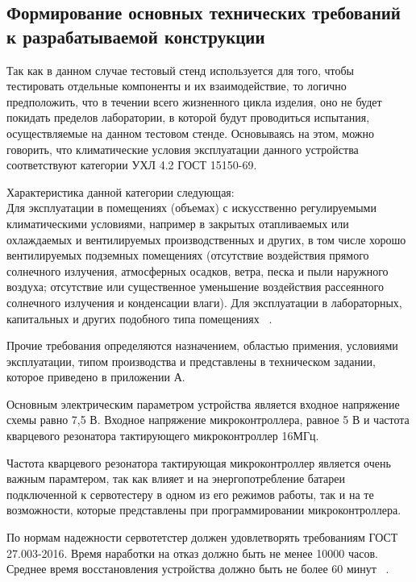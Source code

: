 \subsection{Формирование основных технических требований \\
  к разрабатываемой конструкции}

Так как в данном случае тестовый стенд используется для того, чтобы
тестировать отдельные компоненты и их взаимодействие, то логично
предположить, что в течении всего жизненного цикла изделия, оно не
будет покидать пределов лаборатории, в которой будут проводиться
испытания, осуществляемые на данном тестовом стенде.  Основываясь на
этом, можно говорить, что климатические условия эксплуатации данного
устройства соответствуют категории УХЛ 4.2 ГОСТ 15150-69.

Характеристика данной категории следующая:\\
Для эксплуатации в помещениях (объемах) с искусственно регулируемыми климатическими
условиями, например в закрытых отапливаемых или охлаждаемых и
вентилируемых производственных и других, в том числе хорошо
вентилируемых подземных помещениях (отсутствие воздействия прямого
солнечного излучения, атмосферных осадков, ветра, песка и пыли
наружного воздуха; отсутствие или существенное уменьшение воздействия
рассеянного солнечного излучения и конденсации влаги). Для эксплуатации
в лабораторных, капитальных и других подобного типа помещениях
~\cite{GOST-15150-69}.

Прочие требования определяются назначением, областью примения,
условиями эксплуатации, типом производства и представлены в техническом задании,
которое приведено в приложении А.

Основным электрическим параметром устройства является входное
напряжение схемы равно 7,5 В. Входное напряжение микроконтроллера,
равное 5 В и частота  кварцевого резонатора
тактирующего микроконтроллер 16МГц.

Частота кварцевого резонатора тактирующая микроконтроллер является
очень важным парамтером, так как влияет и на энергопотребление
батареи подключенной к сервотестеру в одном из его режимов работы,
так и на те возможности,
которые представлены при программировании микроконтроллера.

По нормам надежности сервотетстер должен
удовлетворять требованиям ГОСТ 27.003-2016. Время наработки на отказ
должно быть не менее 10000 часов. Среднее время восстановления
устройства должно быть не более 60 минут ~\cite{GOST-27.003-2016}.

